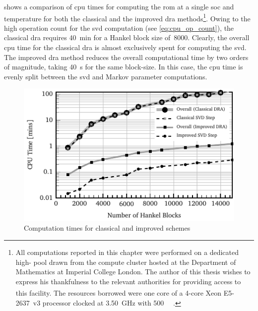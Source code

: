   shows   a  comparison  of  \gls{cpu}   times  for  computing
the   \gls{rom}  at   a  single   \gls{soc}   and  temperature   for  both   the
classical  and  the improved  \gls{dra}  methods\footnote{\label{fn:clusterspec}
All  computations  reported  in  this  chapter were  performed  on  a  dedicated
high-  pool  drawn  from  the compute  cluster  hosted  at  the
Department  of  Mathematics at  Imperial  College  London.  The author  of  this
thesis  wishes  to   express  his  thankfulness  to   the  relevant  authorities
for  providing  access  to  this  facility.  The  resources  borrowed  were  one
core  of  a  \mbox{4-core}  \mbox{\textsuperscript{\textregistered}}
\mbox{Xeon\textsuperscript{\textregistered}} \mbox{E5-2637~v3} processor clocked
at   \SI{3.50}{\giga\hertz}   with   \SI{500}{\giga\byte}   .}.
Owing   to   the   high   operation  count   for   the   \gls{svd}   computation
(see   \cref{eq:cpu_op_count}),  the   classical   \gls{dra}  requires   \approx
\SI{40}{\minute} for a Hankel block size of~8000. Clearly, the overall \gls{cpu}
time for the  classical \gls{dra} is almost exclusively spent  for computing the
\gls{svd}. The improved \gls{dra} method  reduces the overall computational time
by  two  orders of  magnitude,  taking  \approx  \SI{40}{\second} for  the  same
block-size.  In this  case,  the  \gls{cpu} time  is  evenly  split between  the
\gls{svd} and Markov parameter computations.

\begin{figure}[!htbp]
    \centering
    \includegraphics{chapters/dra/figures/cpu_usage.pdf}
    \caption{Computation times for classical and improved  schemes}
    \label{fig:cputime}
\end{figure}

